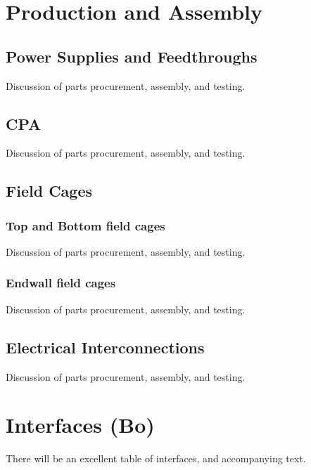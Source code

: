 

\section{Production and Assembly}
\label{sec:fdsp-hv-prod-assy}

\subsection{Power Supplies and Feedthroughs}
\label{sec:fdsp-hv-supplies-feedthroughs}

Discussion of parts procurement, assembly, and testing.

\subsection{CPA}
\label{sec:fdsp-hv-supplies}

Discussion of parts procurement, assembly, and testing.

\subsection{Field Cages}

\subsubsection{Top and Bottom field cages}
Discussion of parts procurement, assembly, and testing.

\subsubsection{Endwall field cages}
Discussion of parts procurement, assembly, and testing.


\subsection{Electrical Interconnections}

Discussion of parts procurement, assembly, and testing.



\section{Interfaces (Bo)}
There will be an excellent table of interfaces, and accompanying text.
\label{sec:fdsp-hv-intfc}

